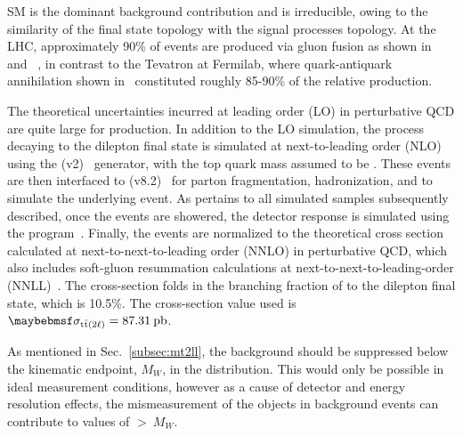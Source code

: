 SM \ttll is the dominant background contribution and is irreducible, owing to the similarity of the final state topology with the signal processes topology. At the LHC, approximately 90\% of \ttbar events are produced via gluon fusion as shown in~ and ~, in contrast to the Tevatron at Fermilab, where quark-antiquark annihilation shown in~ constituted roughly 85-90\% of the relative \ttbar production. 

The theoretical uncertainties incurred at leading order (LO) in perturbative QCD are quite large for \ttbar production. In addition to the LO simulation, the \ttbar process decaying to the dilepton final state is simulated at next-to-leading order (NLO) using the \POWHEG (v2)~\cite{powheg,powheg2} generator, with the top quark mass assumed to be \:\GeV. These events are then interfaced to \Pythia (v8.2)~\cite{Sjostrand:2014zea} for parton fragmentation, hadronization, and to simulate the underlying event. As pertains to all simulated samples subsequently described, once the \ttll events are showered, the detector response is simulated using the  program~\cite{AGOSTINELLI2003250}. Finally, the \ttll events are normalized to the theoretical cross section calculated at next-to-next-to-leading order (NNLO) in perturbative QCD, which also includes soft-gluon resummation calculations at next-to-next-to-leading-order (NNLL)~\cite{ttxsec1,ttxsec2,ttxsec3,ttxsec4,ttxsec5}. The cross-section folds in the branching fraction of \ttbar to the dilepton final state, which is 10.5\%. The cross-section value used is $\sigma_{\ttll}=87.31\:\mathrm{pb}$.

As mentioned in Sec.~\ref{subsec:mt2ll}, the \ttll background should be suppressed below the kinematic endpoint, $M_W$, in the \mttll distribution. This would only be possible in ideal measurement conditions, however as a cause of detector and energy resolution effects, the mismeasurement of the objects in \ttll background events can contribute to values of \mttll$>\:M_W$. 

